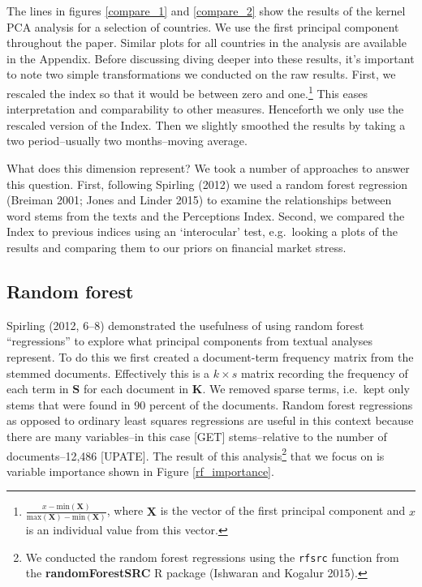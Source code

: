 \documentclass[]{article}
\let\rmarkdownfootnote\footnote%
\def\footnote{\protect\rmarkdownfootnote}
\begin{document}
The lines in figures \ref{compare_1} and \ref{compare_2} show the
results of the kernel PCA analysis for a selection of countries. We use
the first principal component throughout the paper. Similar plots for
all countries in the analysis are available in the Appendix. Before
discussing diving deeper into these results, it's important to note two
simple transformations we conducted on the raw results. First, we
rescaled the index so that it would be between zero and one.\footnote{\(\frac{x - \mathrm{min}(\bm{X})}{\mathrm{max}(\bm{X}) - \mathrm{min}(\bm{X})}\),
  where \(\bm{X}\) is the vector of the first principal component and
  \(x\) is an individual value from this vector.} This eases
interpretation and comparability to other measures. Henceforth we only
use the rescaled version of the Index. Then we slightly smoothed the
results by taking a two period--usually two months--moving average.

What does this dimension represent? We took a number of approaches to
answer this question. First, following Spirling (2012) we used a random
forest regression (Breiman 2001; Jones and Linder 2015) to examine the
relationships between word stems from the texts and the Perceptions
Index. Second, we compared the Index to previous indices using an
`interocular' test, e.g.~looking a plots of the results and comparing
them to our priors on financial market stress.

\subsection{Random forest}\label{random-forest}

Spirling (2012, 6--8) demonstrated the usefulness of using random forest
``regressions'' to explore what principal components from textual
analyses represent. To do this we first created a document-term
frequency matrix from the stemmed documents. Effectively this is a
\(k \times s\) matrix recording the frequency of each term in \(\bm{S}\)
for each document in \(\bm{K}\). We removed sparse terms, i.e.~kept only
stems that were found in 90 percent of the documents. Random forest
regressions as opposed to ordinary least squares regressions are useful
in this context because there are many variables--in this case {[}GET{]}
stems--relative to the number of documents--12,486 {[}UPATE{]}. The
result of this analysis\footnote{We conducted the random forest
  regressions using the \texttt{rfsrc} function from the
  \textbf{randomForestSRC} R package (Ishwaran and Kogalur 2015).} that
we focus on is variable importance shown in Figure \ref{rf_importance}.
\end{document}
